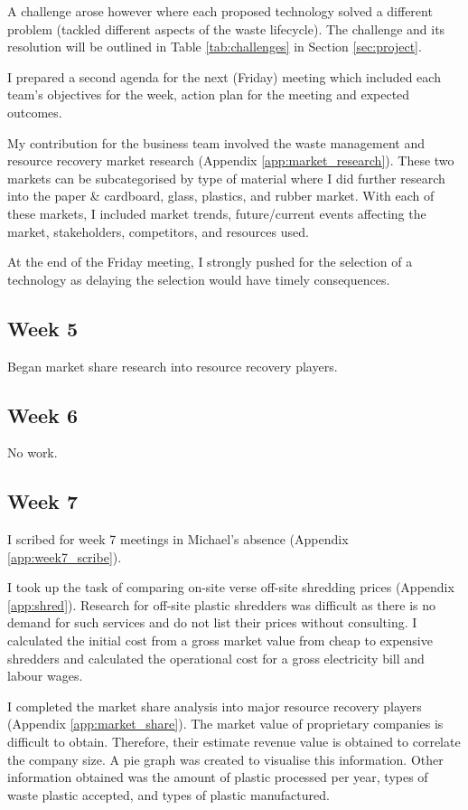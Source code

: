 \documentclass[11pt, a4, nocenter, margin=150mm]{article}
\begin{document}
	A challenge arose however where each proposed technology solved a different problem (tackled different aspects of the waste lifecycle). The challenge and its resolution will be outlined in Table \ref{tab:challenges} in Section \ref{sec:project}.

	I prepared a second agenda for the next (Friday) meeting which included each team's objectives for the week, action plan for the meeting and expected outcomes.

	My contribution for the business team involved the waste management and resource recovery market research (Appendix \ref{app:market_research}). These two markets can be subcategorised by type of material where I did further research into the paper \& cardboard, glass, plastics, and rubber market. With each of these markets, I included market trends, future/current events affecting the market, stakeholders, competitors, and resources used.

	At the end of the Friday meeting, I strongly pushed for the selection of a technology as delaying the selection would have timely consequences.

	\subsection{Week 5}

	Began market share research into resource recovery players.

	\subsection{Week 6}

	No work.

	\subsection{Week 7}

	I scribed for week 7 meetings in Michael's absence (Appendix \ref{app:week7_scribe}).

	I took up the task of comparing on-site verse off-site shredding prices (Appendix \ref{app:shred}). Research for off-site plastic shredders was difficult as there is no demand for such services and do not list their prices without consulting. I calculated the initial cost from a gross market value from cheap to expensive shredders and calculated the operational cost for a gross electricity bill and labour wages.

	I completed the market share analysis into major resource recovery players (Appendix \ref{app:market_share}). The market value of proprietary companies is difficult to obtain. Therefore, their estimate revenue value is obtained to correlate the company size. A pie graph was created to visualise this information. Other information obtained was the amount of plastic processed per year, types of waste plastic accepted, and types of plastic manufactured.
\end{document}
